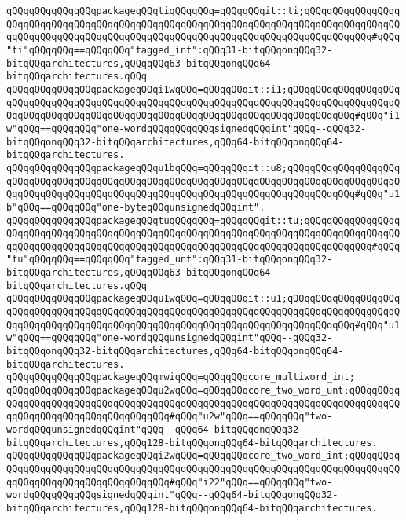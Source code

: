 \newline
\verb|qQQqqQQqqQQqqQQqpackageqQQqtiqQQqqQQq=qQQqqQQqit::ti;qQQqqQQqqQQqqQQqqQQqqQQqqQQqqQQqqQQqqQQqqQQqqQQqqQQqqQQqqQQqqQQqqQQqqQQqqQQqqQQqqQQqqQQqqQQqqQQqqQQqqQQqqQQqqQQqqQQqqQQqqQQqqQQqqQQqqQQqqQQqqQQqqQQqqQQq#qQQq"ti"qQQqqQQq==qQQqqQQq"tagged_int":qQQq31-bitqQQqonqQQq32-bitqQQqarchitectures,qQQqqQQq63-bitqQQqonqQQq64-bitqQQqarchitectures.qQQq|\newline
\verb|qQQqqQQqqQQqqQQqpackageqQQqi1wqQQq=qQQqqQQqit::i1;qQQqqQQqqQQqqQQqqQQqqQQqqQQqqQQqqQQqqQQqqQQqqQQqqQQqqQQqqQQqqQQqqQQqqQQqqQQqqQQqqQQqqQQqqQQqqQQqqQQqqQQqqQQqqQQqqQQqqQQqqQQqqQQqqQQqqQQqqQQqqQQqqQQqqQQq#qQQq"i1w"qQQq==qQQqqQQq"one-wordqQQqqQQqqQQqsignedqQQqint"qQQq--qQQq32-bitqQQqonqQQq32-bitqQQqarchitectures,qQQq64-bitqQQqonqQQq64-bitqQQqarchitectures.|\newline
\newline
\verb|qQQqqQQqqQQqqQQqpackageqQQqu1bqQQq=qQQqqQQqit::u8;qQQqqQQqqQQqqQQqqQQqqQQqqQQqqQQqqQQqqQQqqQQqqQQqqQQqqQQqqQQqqQQqqQQqqQQqqQQqqQQqqQQqqQQqqQQqqQQqqQQqqQQqqQQqqQQqqQQqqQQqqQQqqQQqqQQqqQQqqQQqqQQqqQQqqQQq#qQQq"u1b"qQQq==qQQqqQQq"one-byteqQQqunsignedqQQqint".|\newline
\verb|qQQqqQQqqQQqqQQqpackageqQQqtuqQQqqQQq=qQQqqQQqit::tu;qQQqqQQqqQQqqQQqqQQqqQQqqQQqqQQqqQQqqQQqqQQqqQQqqQQqqQQqqQQqqQQqqQQqqQQqqQQqqQQqqQQqqQQqqQQqqQQqqQQqqQQqqQQqqQQqqQQqqQQqqQQqqQQqqQQqqQQqqQQqqQQqqQQqqQQq#qQQq"tu"qQQqqQQq==qQQqqQQq"tagged_unt":qQQq31-bitqQQqonqQQq32-bitqQQqarchitectures,qQQqqQQq63-bitqQQqonqQQq64-bitqQQqarchitectures.qQQq|\newline
\verb|qQQqqQQqqQQqqQQqpackageqQQqu1wqQQq=qQQqqQQqit::u1;qQQqqQQqqQQqqQQqqQQqqQQqqQQqqQQqqQQqqQQqqQQqqQQqqQQqqQQqqQQqqQQqqQQqqQQqqQQqqQQqqQQqqQQqqQQqqQQqqQQqqQQqqQQqqQQqqQQqqQQqqQQqqQQqqQQqqQQqqQQqqQQqqQQqqQQq#qQQq"u1w"qQQq==qQQqqQQq"one-wordqQQqunsignedqQQqint"qQQq--qQQq32-bitqQQqonqQQq32-bitqQQqarchitectures,qQQq64-bitqQQqonqQQq64-bitqQQqarchitectures.|\newline
\verb|qQQqqQQqqQQqqQQqpackageqQQqmwiqQQq=qQQqqQQqcore_multiword_int;|\newline
\newline
\verb|qQQqqQQqqQQqqQQqpackageqQQqu2wqQQq=qQQqqQQqcore_two_word_unt;qQQqqQQqqQQqqQQqqQQqqQQqqQQqqQQqqQQqqQQqqQQqqQQqqQQqqQQqqQQqqQQqqQQqqQQqqQQqqQQqqQQqqQQqqQQqqQQqqQQqqQQqqQQq#qQQq"u2w"qQQq==qQQqqQQq"two-wordqQQqunsignedqQQqint"qQQq--qQQq64-bitqQQqonqQQq32-bitqQQqarchitectures,qQQq128-bitqQQqonqQQq64-bitqQQqarchitectures.|\newline
\verb|qQQqqQQqqQQqqQQqpackageqQQqi2wqQQq=qQQqqQQqcore_two_word_int;qQQqqQQqqQQqqQQqqQQqqQQqqQQqqQQqqQQqqQQqqQQqqQQqqQQqqQQqqQQqqQQqqQQqqQQqqQQqqQQqqQQqqQQqqQQqqQQqqQQqqQQqqQQq#qQQq"i22"qQQq==qQQqqQQq"two-wordqQQqqQQqqQQqsignedqQQqint"qQQq--qQQq64-bitqQQqonqQQq32-bitqQQqarchitectures,qQQq128-bitqQQqonqQQq64-bitqQQqarchitectures.|\newline
